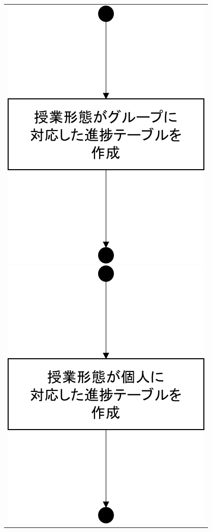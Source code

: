 \begin{figure}[htbp]
  \begin{tabular}{c}
 \begin{minipage}{0.33\hsize}
  \begin{center}
   \includegraphics[width=0.8\linewidth,clip]{./img/flow/57.png}
  \end{center}
 \end{minipage}
 \begin{minipage}{0.33\hsize}
  \begin{center}
   \includegraphics[width=0.8\linewidth,clip]{./img/flow/58.png}

\end{center}
\end{minipage}
\end{tabular}
\end{figure}
